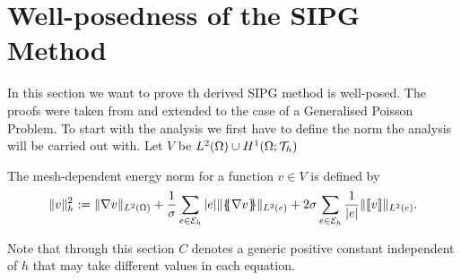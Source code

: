 

\section{Well-posedness of the SIPG Method}

In this section we want to prove th derived SIPG method is well-posed. The proofs were taken from \cite{BS2002, PPO+2000} and extended to the case of a Generalised Poisson Problem. 
To start with the analysis we first have to define the norm the analysis will be carried out with. Let $V$ be $L^2(\Omega) \cup H^1(\Omega; \mathcal{T}_h)$ 
\begin{definition} \label{def: energy norm}
	The mesh-dependent energy norm for a function $v \in V$ is defined by
	\[
	\lVert v \rVert_{h} ^2 := \lVert \nabla v \rVert_{L^2(\Omega)} + \frac 1 \sigma \sum_{e \in \mathcal{E}_h} |e|\lVert \{\!\!\{ \nabla v \}\!\!\} \rVert_{L^2(e)} + 2 \sigma \sum_{e \in \mathcal{E}_h} \frac 1 {|e|}\lVert \llbracket v \rrbracket \rVert_{L^2(e)}.
	\]
\end{definition}

Note that through this section $C$ denotes a generic positive constant independent of $h$ that may take different values in each equation.

